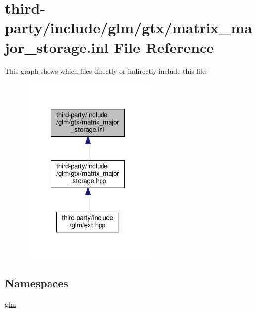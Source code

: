 \hypertarget{matrix__major__storage_8inl}{}\section{third-\/party/include/glm/gtx/matrix\+\_\+major\+\_\+storage.inl File Reference}
\label{matrix__major__storage_8inl}
This graph shows which files directly or indirectly include this file\+:
\nopagebreak
\begin{figure}[H]
\begin{center}
\leavevmode
\includegraphics[width=191pt]{matrix__major__storage_8inl__dep__incl}
\end{center}
\end{figure}
\subsection*{Namespaces}
\begin{DoxyCompactItemize}
\item 
 \hyperlink{namespaceglm}{glm}
\end{DoxyCompactItemize}
